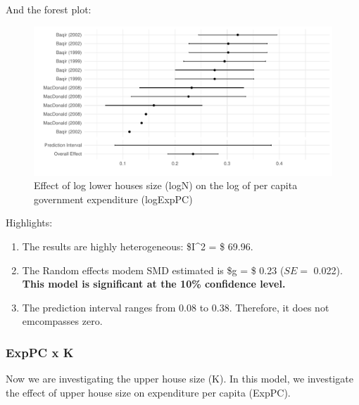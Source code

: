 \documentclass[
]{article}
\providecommand{\tightlist}{%
  \setlength{\itemsep}{0pt}\setlength{\parskip}{0pt}}
\begin{document}
And the forest plot:

\begin{figure}
\centering
\includegraphics{appendixV5_files/figure-latex/unnamed-chunk-41-1.pdf}
\caption{Effect of log lower houses size (logN) on the log of per capita
government expenditure (logExpPC)}
\end{figure}

Highlights:

\begin{enumerate}
\def\labelenumi{\arabic{enumi}.}
\tightlist
\item
  The results are highly heterogeneous: \$I\^{}2 = \$ 69.96.
\item
  The Random effects modem SMD estimated is \$g = \$ 0.23 (\(SE =\)
  0.022). \textbf{This model is significant at the 10\% confidence
  level.}
\item
  The prediction interval ranges from 0.08 to 0.38. Therefore, it does
  not emcompasses zero.
\end{enumerate}

\newpage

\hypertarget{exppc-x-k-1}{%
\subsubsection{ExpPC x K}\label{exppc-x-k-1}}

Now we are investigating the upper house size (K). In this model, we
investigate the effect of upper house size on expenditure per capita
(ExpPC).
\end{document}
